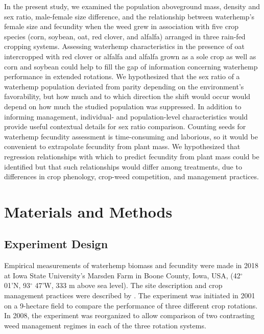 \documentclass[utf8]{frontiersSCNS}
\begin{document}
In the present study, we examined the population aboveground mass, density and sex ratio, male-female size difference, and the relationship between waterhemp's female size and fecundity when the weed grew in association with five crop species (corn, soybean, oat, red clover, and alfalfa) arranged in three rain-fed cropping systems. Assessing waterhemp characteristics in the presence of oat intercropped with red clover or alfalfa and alfalfa grown as a sole crop as well as corn and soybean could help to fill the gap of information concerning waterhemp performance in extended rotations. We hypothesized that the sex ratio of a waterhemp population deviated from parity depending on the environment's favorability, but how much and to which direction the shift would occur would depend on how much the studied population was suppressed. In addition to informing management, individual- and population-level characteristics would provide useful contextual details for sex ratio comparison. Counting seeds for waterhemp fecundity assessment is time-consuming and laborious, so it would be convenient to extrapolate fecundity from plant mass. We hypothesized that regression relationships with which to predict fecundity from plant mass could be identified but that such relationships would differ among treatments, due to differences in crop phenology, crop-weed competition, and management practices.

\hypertarget{materials-and-methods}{%
\section*{Materials and Methods}\label{materials-and-methods}}

\hypertarget{experiment-design}{%
\subsection*{Experiment Design}\label{experiment-design}}

Empirical measurements of waterhemp biomass and fecundity were made in 2018 at Iowa State University's Marsden Farm in Boone County, Iowa, USA, (42\(^\circ\) 01'N, 93\(^\circ\) 47'W, 333 m above sea level). The site description and crop management practices were described by \citet{liebmanWeedSeedbankDiversity2021}. The experiment was initiated in 2001 on a 9-hectare field to compare the performance of three different crop rotations. In 2008, the experiment was reorganized to allow comparison of two contrasting weed management regimes in each of the three rotation systems.
\end{document}
